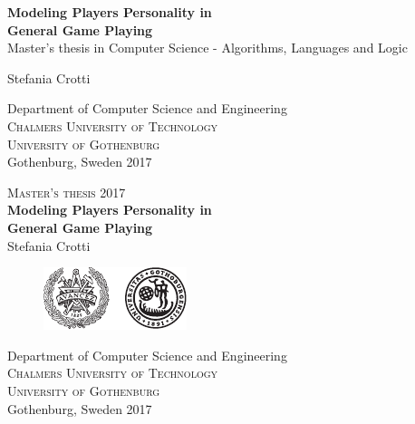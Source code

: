 \begin{titlepage}
			
\addtolength{\voffset}{2cm}

\mbox{}
\vfill
\renewcommand{\familydefault}{\sfdefault} \normalfont %
\textbf{{\Huge 	Modeling Players Personality in  	\\[0.2cm] 
				General Game Playing}} 	\\[1.5cm]
Master's thesis in Computer Science - Algorithms, Languages and Logic \setlength{\parskip}{1cm}

{\Large Stefania Crotti} \setlength{\parskip}{2.9cm}

Department of Computer Science and Engineering \\
\textsc{Chalmers University of Technology} \\
\textsc{University of Gothenburg} \\
Gothenburg, Sweden 2017

\renewcommand{\familydefault}{\rmdefault} \normalfont %
\end{titlepage}


\newpage
\restoregeometry
\thispagestyle{empty}
\mbox{}


\newpage
\thispagestyle{empty}
\begin{center}
	\textsc{\large Master's thesis 2017}\\[4cm]		%
	\textbf{\Large Modeling Players Personality in\\ General Game Playing} \\[2cm]
	{\large Stefania Crotti}
	
	\vfill	
		
	\begin{figure}[H]
	\centering
	
	\includegraphics[width=0.4\pdfpagewidth]{figure/auxiliary/logo_ch_gu.pdf} \\	
	\end{figure}	\vspace{5mm}	
	
	Department of Computer Science and Engineering \\
	\textsc{Chalmers University of Technology} \\
	\textsc{University of Gothenburg} \\
	Gothenburg, Sweden 2017 \\
\end{center}


